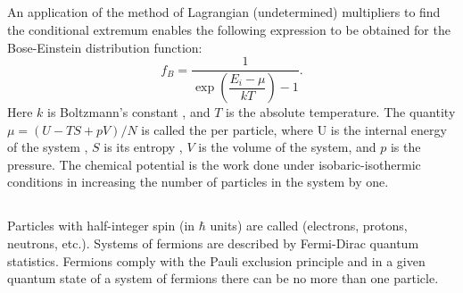 \subsection{}\label{41.2.3} An application of the method of Lagrangian (undetermined) multipliers to find the conditional extremum enables the following expression to be obtained for the Bose-Einstein distribution function:
\begin{equation*}%
f_{B} = \frac{1}{\exp \left(\dfrac{E_{i} - \mu}{kT} \right) -1}.
\end{equation*}
Here $k$ is Boltzmann's constant , and $T$ is the absolute temperature. The quantity $\mu = (U - TS + pV)/N$ is called the  per particle, where U is the internal energy of the system , $S$ is its entropy , $V$ is the volume
of the system, and $p$ is the pressure. The chemical potential is the work done under isobaric-isothermic conditions in increasing the number of particles in the system by one.

\subsection{}\label{41.2.4} Particles with half-integer spin (in $\hbar$ units)  are called  (electrons, protons, neutrons, etc.). Systems of fermions are described by Fermi-Dirac quantum statistics. Fermions comply with the Pauli exclusion principle  and in a given quantum state of a system of fermions there can be no more than one particle.



